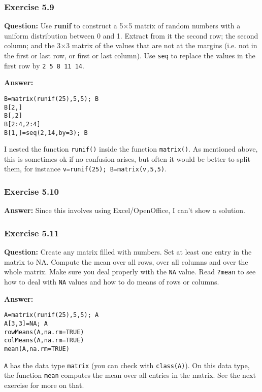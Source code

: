 \documentclass [11pt]{article}
\newcommand{\code}[1]{{\tt #1}}
\begin{document}
\subsubsection*{Exercise 5.9}
\textbf{Question:} Use \textbf{runif} to construct a 5$\times $5 matrix of random numbers with a uniform distribution between 0 and 1. Extract from it the second row; the second column; and the 3$\times $3 matrix of the values that are not at the margins (i.e. not in the first or last row, or first or last column). Use \code{seq} to replace the values in the first row by \texttt{2 5 8 11 14}. 

\textbf{Answer:}\\
\begin{verbatim}
B=matrix(runif(25),5,5); B
B[2,]
B[,2]
B[2:4,2:4]
B[1,]=seq(2,14,by=3); B
\end{verbatim}
I nested the function \code{runif()} inside the function \code{matrix()}. As mentioned above, this is sometimes ok if no confusion arises, but often it would be better to split them, for instance \code{v=runif(25); B=matrix(v,5,5)}.

\subsubsection*{Exercise 5.10}
\textbf{Answer:} Since this involves using Excel/OpenOffice, I can't show a solution.

\subsubsection*{Exercise 5.11}
\textbf{Question:} Create any matrix filled with numbers. Set at least one entry in the matrix to NA. Compute the mean over all rows, over all columns and over the whole matrix. Make sure you deal properly with the \code{NA} value. Read \code{?mean} to see how to deal with \code{NA} values and how to do means of rows or columns.

\textbf{Answer:}
\begin{verbatim}
A=matrix(runif(25),5,5); A 
A[3,3]=NA; A
rowMeans(A,na.rm=TRUE)
colMeans(A,na.rm=TRUE)
mean(A,na.rm=TRUE)
\end{verbatim}
\code{A} has the data type \code{matrix} (you can check with \code{class(A)}). On this data type, the function \code{mean} computes the mean over all entries in the matrix. See the next exercise for more on that.
\end{document}
